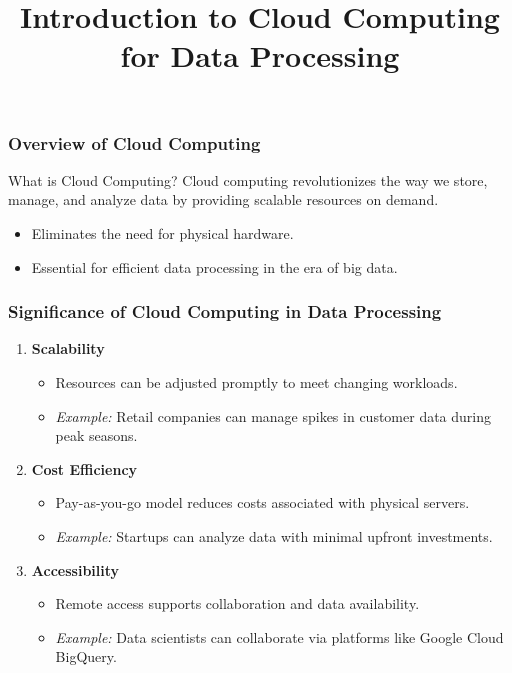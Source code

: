 \documentclass[aspectratio=169]{beamer}
\begin{document}
\frame{\titlepage}

\begin{frame}[fragile]
    \title{Introduction to Cloud Computing for Data Processing}
    \maketitle
\end{frame}

\begin{frame}[fragile]
    \frametitle{Overview of Cloud Computing}
    \begin{block}{What is Cloud Computing?}
        Cloud computing revolutionizes the way we store, manage, and analyze data by providing scalable resources on demand. 
    \end{block}
    \begin{itemize}
        \item Eliminates the need for physical hardware.
        \item Essential for efficient data processing in the era of big data.
    \end{itemize}
\end{frame}

\begin{frame}[fragile]
    \frametitle{Significance of Cloud Computing in Data Processing}
    \begin{enumerate}
        \item \textbf{Scalability}
            \begin{itemize}
                \item Resources can be adjusted promptly to meet changing workloads.
                \item \textit{Example:} Retail companies can manage spikes in customer data during peak seasons.
            \end{itemize}

        \item \textbf{Cost Efficiency}
            \begin{itemize}
                \item Pay-as-you-go model reduces costs associated with physical servers.
                \item \textit{Example:} Startups can analyze data with minimal upfront investments.
            \end{itemize}

        \item \textbf{Accessibility}
            \begin{itemize}
                \item Remote access supports collaboration and data availability.
                \item \textit{Example:} Data scientists can collaborate via platforms like Google Cloud BigQuery.
            \end{itemize}
    \end{enumerate}
\end{frame}
\end{document}
